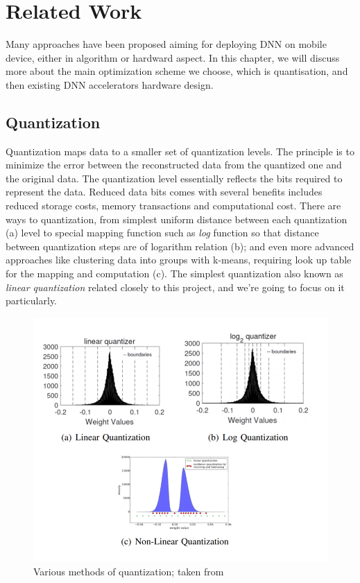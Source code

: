 \chapter{Related Work}
\label{ch:related_work}
Many approaches have been proposed aiming for deploying DNN on mobile device, either in algorithm or hardward aspect. In this chapter, we will discuss more about the main optimization scheme we choose, which is quantisation, and then existing DNN accelerators hardware design.
\section{Quantization}
Quantization maps data to a smaller set of quantization levels. The principle is to minimize the error between the reconstructed data from the quantized one and the original data. The quantization level essentially reflects the bits required to represent the data. Reduced data bits comes with several benefits includes reduced storage costs, memory transactions and computational cost. There are ways to quantization, from simplest uniform distance between each quantization (a) level to special mapping function such as \textit{log} function so that distance between quantization steps are of logarithm relation (b); and even more advanced approaches like clustering data into groups with k-means, requiring look up table for the mapping and computation (c). The simplest quantization also known as \textit{linear quantization} related closely to this project, and we're going to focus on it particularly.
\begin{figure}
    \centering
    \includegraphics[width=0.8\linewidth]{inc/2_related_work/figure/quantization_types.png}
    \caption{Various methods of quantization; taken from \cite{lognet}\cite{DeepCompression}}
    \label{fig:quant_types}
\end{figure}
